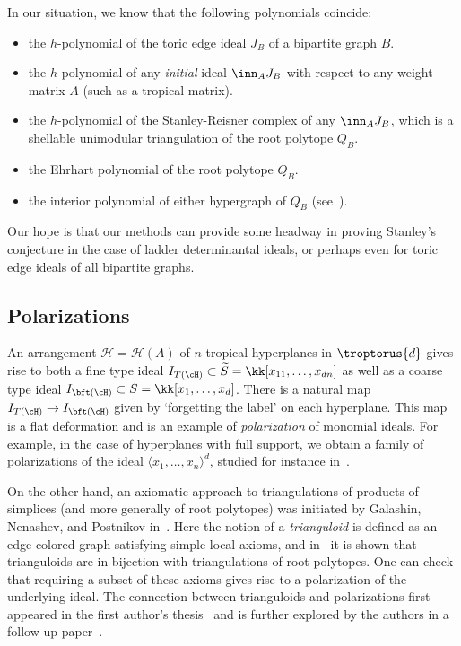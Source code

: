 In our situation, we know that the following polynomials coincide:
\begin{itemize}
    \item the $h$-polynomial of the toric edge ideal $J_B$ of a bipartite graph $B$.
    \item the $h$-polynomial of any \textit{initial} ideal $\inn_A J_B$ with respect to any weight matrix $A$ (such as a tropical matrix). 
    \item the $h$-polynomial of the Stanley-Reisner complex of any $\inn_A J_B$, which is a shellable unimodular triangulation of the root polytope $Q_B$.
    \item the Ehrhart polynomial of the root polytope $Q_B$.
    \item the interior polynomial of either hypergraph of $Q_B$ (see~\cite{KalPos}).    
\end{itemize}

Our hope is that our methods can provide some headway in proving Stanley's conjecture in the case of ladder determinantal ideals, or perhaps even for toric edge ideals of all bipartite graphs.
    
\subsection{Polarizations}
An arrangement ${\mathcal H} = {\mathcal H}(A)$ of $n$ tropical hyperplanes in $\troptorus{d}$ gives rise to both a fine type ideal $I_{T(\cH)} \subset \widetilde S = \kk[x_{11}, \dots, x_{dn}]$ as well as a coarse type ideal $I_{\bft(\cH)} \subset S = \kk[x_1, \dots, x_d]$.  There is a natural map $I_{T(\cH)} \rightarrow I_{\bft(\cH)}$ given by `forgetting the label' on each hyperplane. This map is a flat deformation and is an example of \emph{polarization} of monomial ideals. For example, in the case of hyperplanes with full support, we obtain a family of polarizations of the ideal $\langle x_1, \dots, x_n \rangle ^d$, studied for instance in~\cite{almousa2019polarizations}.

On the other hand, 
an axiomatic approach to triangulations of products of simplices (and more generally of root polytopes) was initiated by Galashin, Nenashev, and Postnikov in~\cite{galashin2018trianguloids}. Here the notion of a \emph{trianguloid} is defined as an edge colored graph satisfying simple local axioms, and in~\cite{galashin2018trianguloids} it is shown that trianguloids are in bijection with triangulations of root polytopes. One can check that requiring a subset of these axioms gives rise to a polarization of the underlying ideal. The connection between trianguloids and polarizations first appeared in the first author's thesis~\cite{almousa2021combinatorial} and is further explored by the authors in a follow up paper~\cite{ADSpolarizations}.

